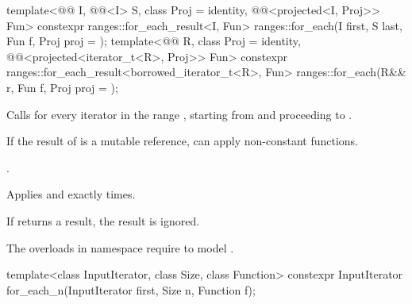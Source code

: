 %
\begin{itemdecl}
template<@@ I, @@<I> S, class Proj = identity,
         @@<projected<I, Proj>> Fun>
  constexpr ranges::for_each_result<I, Fun>
    ranges::for_each(I first, S last, Fun f, Proj proj = {});
template<@@ R, class Proj = identity,
         @@<projected<iterator_t<R>, Proj>> Fun>
  constexpr ranges::for_each_result<borrowed_iterator_t<R>, Fun>
    ranges::for_each(R&& r, Fun f, Proj proj = {});
\end{itemdecl}

\begin{itemdescr}
\pnum
\effects
Calls 
for every iterator  in the range ,
starting from  and proceeding to .
\begin{note}
If the result of  is a mutable reference,
 can apply non-constant functions.
\end{note}

\pnum
\returns
{}.

\pnum
\complexity
Applies  and  exactly  times.

\pnum
\remarks
If  returns a result, the result is ignored.

\pnum
\begin{note}
The overloads in namespace  require
 to model .
\end{note}
\end{itemdescr}

%
\begin{itemdecl}
template<class InputIterator, class Size, class Function>
  constexpr InputIterator for_each_n(InputIterator first, Size n, Function f);
\end{itemdecl}

